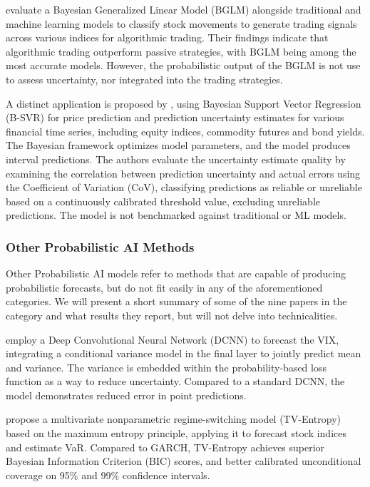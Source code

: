 \textcite{Grudniewicz2023Application} evaluate a Bayesian Generalized Linear Model (BGLM) alongside traditional and machine learning models to classify stock movements to generate trading signals across various indices for algorithmic trading. Their findings indicate that algorithmic trading outperform passive strategies, with BGLM being among the most accurate models. However, the probabilistic output of the BGLM is not use to assess uncertainty, nor integrated into the trading strategies. 

A distinct application is proposed by \textcite{Law2017Practical}, using Bayesian Support Vector Regression (B-SVR) for price prediction and prediction uncertainty estimates for various financial time series, including equity indices, commodity futures and bond yields. The Bayesian framework optimizes model parameters, and the model produces interval predictions. The authors evaluate the uncertainty estimate quality by examining the correlation between prediction uncertainty and actual errors using the Coefficient of Variation (CoV), classifying predictions as reliable or unreliable based on a continuously calibrated threshold value, excluding unreliable predictions. The model is not benchmarked against traditional or ML models. 


\subsubsection{Other Probabilistic AI Methods}
Other Probabilistic AI models refer to methods that are capable of producing probabilistic forecasts, but do not fit easily in any of the aforementioned categories. We will present a short summary of some of the nine papers in the category and what results they report, but will not delve into technicalities.

\textcite{Daniali2021} employ a Deep Convolutional Neural Network (DCNN) to forecast the VIX, integrating a conditional variance model in the final layer to jointly predict mean and variance. The variance is embedded within the probability-based loss function as a way to reduce uncertainty. Compared to a standard DCNN, the model demonstrates reduced error in point predictions. 

\textcite{Horenko2020} propose a multivariate nonparametric regime-switching model (TV-Entropy) based on the maximum entropy principle, applying it to forecast stock indices and estimate VaR. Compared to GARCH, TV-Entropy achieves superior Bayesian Information Criterion (BIC) scores, and better calibrated unconditional coverage on 95\% and 99\% confidence intervals. 

